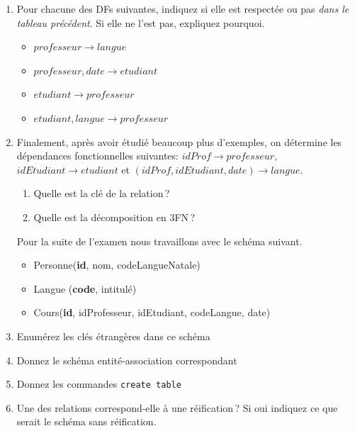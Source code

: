 \begin{enumerate}
   \item Pour chacune des DFs suivantes, indiquez si elle est respectée ou pas
   \emph{dans le tableau précédent}. Si elle ne l'est pas, expliquez pourquoi.
   
   \begin{itemize}
     \item $professeur \to langue$
     \item   $professeur, date \to etudiant$
     \item $etudiant \to professeur$
     \item $etudiant, langue \to professeur$
   \end{itemize}

   \item Finalement, après avoir étudié beaucoup plus d'exemples, on
      détermine les dépendances fonctionnelles suivantes: 
      $idProf \to professeur$, $idEtudiant \to etudiant$ et
      $(idProf, idEtudiant, date) \to langue$. 
      \begin{enumerate}
        \item Quelle est la clé de la relation\,?
        \item Quelle est la décomposition en 3FN\,?
      \end{enumerate}
      
   Pour la suite de l'examen nous travaillons avec le schéma suivant.
    
\begin{itemize}
\item Personne(\textbf{id}, nom, codeLangueNatale)
\item Langue (\textbf{code}, intitulé)
\item Cours(\textbf{id}, idProfesseur, idEtudiant, codeLangue, date)
\end{itemize}

  \item Enumérez les clés étrangères dans ce schéma
  \item Donnez le schéma entité-association correspondant
  \item Donnez les commandes \texttt{create table}
  \item Une des relations correspond-elle à une réification\,? Si oui
     indiquez ce que serait le schéma sans réification.
\end{enumerate}

